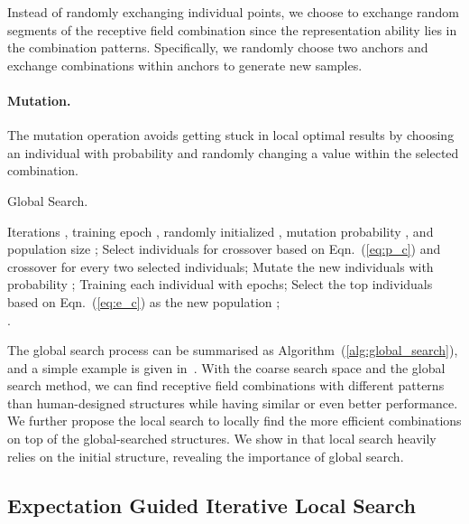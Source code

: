 \documentclass[final]{cvpr}
\renewcommand{\eqref}[1]{Eqn.~(\ref{#1})}
\renewcommand{\algref}[1]{Algorithm~(\ref{#1})}
\newcommand{\myPara}[1]{\vspace{-.12in}\paragraph{#1}}
\newcommand{\tbf}[1]{\textbf{#1}}
\begin{document}
Instead of randomly exchanging individual points, 
we choose to exchange random segments of the receptive field combination 
since the representation ability lies in the combination patterns.
Specifically, we randomly choose two anchors and exchange combinations within anchors to generate new samples. 


\myPara{Mutation.} 
The mutation operation avoids getting stuck 
in local optimal results by choosing an 
individual with probability  and 
randomly changing a value within the selected combination.


\begin{algorithm}[htb] 
  \caption{Global Search.} 
  \label{alg:global_search} 
  \begin{algorithmic}
    \renewcommand{\algorithmicrequire}{\tbf{Input:}}
    \Require Iterations , training epoch , randomly initialized , 
    mutation probability , and population size ;
      \State Select individuals for crossover based on \eqref{eq:p_c} and 
      crossover for every two selected individuals;
      \State Mutate the new individuals with probability ;
      \State Training each individual with  epochs;
      \State Select the top  individuals based on \eqref{eq:e_c} 
      as the new population ;
   \EndFor \\
   \Return .
  \end{algorithmic} 
\end{algorithm}


The global search process can be summarised as \algref{alg:global_search},
and a simple example is given in~. 
With the coarse search space and the global search method,
we can find receptive field combinations with different patterns than 
human-designed structures while having similar or even better performance.
We further propose the local search to locally find the more efficient 
combinations on top of the global-searched structures.
We show in  that local search heavily relies 
on the initial structure,
revealing the importance of global search.



\subsection{Expectation Guided Iterative Local Search} \label{sec:ls}
\end{document}

